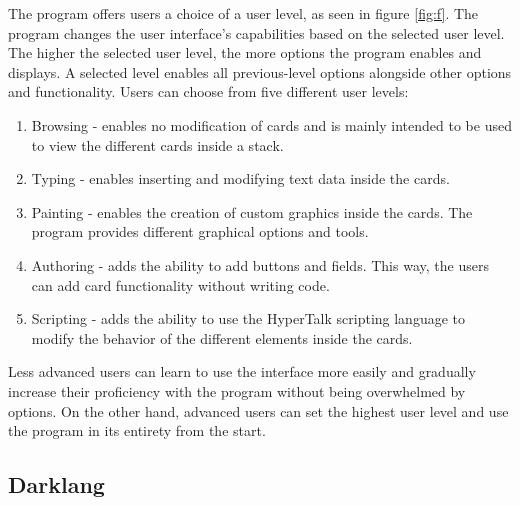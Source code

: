 The program offers users a choice of a user level, as seen in figure \ref{fig:f}. The program changes the user interface's capabilities based on the selected user level.
The higher the selected user level, the more options the program enables and displays. A selected level enables all previous-level options alongside other options and functionality.
Users can choose from five different user levels:
\begin{enumerate}
	\item Browsing - enables no modification of cards and is mainly intended to be used to view the different cards inside a stack.
	\item Typing - enables inserting and modifying text data inside the cards.
	\item Painting - enables the creation of custom graphics inside the cards. The program provides different graphical options and tools.
	\item Authoring - adds the ability to add buttons and fields. This way, the users can add card functionality without writing code.
	\item Scripting - adds the ability to use the HyperTalk scripting language to modify the behavior of the different elements inside the cards.
\end{enumerate}
Less advanced users can learn to use the interface more easily and gradually increase their proficiency with the program without being overwhelmed by options.
On the other hand, advanced users can set the highest user level and use the program in its entirety from the start.


\subsection{Darklang}
\label{sec:darklang}

